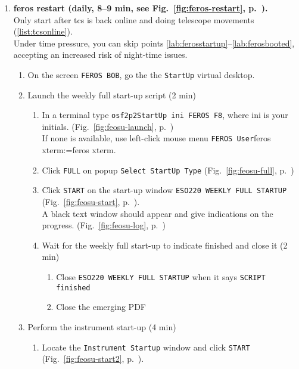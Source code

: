 \documentclass[11pt,fleqn]{book}
\makeatletter
\def\menu#1#2{\texttt{#1}\ifx{}#2\else\@for\@x:=#2\do{$\rightarrow$\texttt{\@x}}\fi}
\def\mmenu#1#2{left-click mouse menu \menu{#1}{#2}}
\def\figref#1{Fig.~\ref{fig:#1}, p.~\pageref{fig:#1}}
\makeatother
\begin{document}
\begin{enumerate}
\begin{enumerate}
\begin{enumerate}
          \end{enumerate}
        \end{enumerate}
  \item \textbf{\gls{feros} restart (daily, 8--9 min, see \figref{feros-restart}).}\\
        Only start after \gls{tcs} is back online and doing telescope movements (\ref{list:tcsonline}).\\
        Under time pressure, you can skip points \ref{lab:ferosstartup}--\ref{lab:ferosbooted}, accepting an increased risk of night-time issues.
        \label{list:feros}
        \begin{enumerate}
         \item \label{lab:ferosstartup} On the screen \texttt{FEROS BOB},  go the the \texttt{StartUp} virtual desktop.
         \item Launch the weekly full start-up script (2 min)
         \begin{enumerate}
            \item In a terminal type \texttt{osf2p2StartUp ini FEROS F8}, where ini is your initials. (\figref{feosu-launch})\\
               If none is available, use \mmenu{FEROS User}{feros xterm}.
            \item Click \texttt{FULL} on popup \texttt{Select StartUp Type} (\figref{feosu-full})
            \item Click \texttt{START} on the start-up window \texttt{ESO220 WEEKLY FULL STARTUP} (\figref{feosu-start}).\\
               A black text window should appear and give indications on the progress. (\figref{feosu-log})
             \item Wait for the weekly full start-up to indicate finished and close it (2 min)
                \begin{enumerate}
                   \item Close \texttt{ESO220 WEEKLY FULL STARTUP} when it says \texttt{SCRIPT finished} 
                   \item Close the emerging PDF
                \end{enumerate}
            \end{enumerate}
         \item Perform the instrument start-up (4 min) 
            \begin{enumerate}
                \item Locate the \texttt{Instrument Startup} window and click \texttt{START} (\figref{feosu-start2}).

\end{enumerate}
\end{enumerate}
\end{enumerate}
\end{document}
